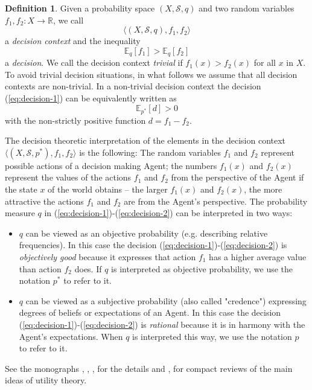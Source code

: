 \documentclass[10pt, letterpaper]{article}%
\theoremstyle{definition}
\newtheorem{definition}[theorem]{Definition}
\newcommand{\E}{\mathbb E}
\newcommand{\1}{\mathbf 1}
\begin{document}
\begin{definition}
Given a probability space $(X,\mathcal{S}, q)$ and two random variables $f_1,f_2\colon X\to\mathbb{R}$, we call
\begin{equation}
\big\langle (X,\mathcal{S},q),f_1,f_2 \big\rangle
\end{equation}
a \emph{decision context} and the inequality 
\begin{equation}\label{eq:decision-1}
\E_q[f_1]  >\E_q[f_2]
\end{equation}
a \emph{decision}. We call the decision context \emph{trivial} if $f_1(x)>f_2(x)$ for all $x$ in $X$. To avoid trivial decision situations, in what follows we assume that all decision contexts are non-trivial. In a non-trivial decision context the decision (\ref{eq:decision-1}) can be equivalently written as 
\begin{equation}\label{eq:decision-2}
\E_{p^*}[d]>0
\end{equation}
with the non-strictly positive function $d=f_1-f_2$. 
\end{definition}
The decision theoretic interpretation of the elements in the decision context $\big\langle (X,\mathcal{S},{p}^*),f_1,f_2 \big\rangle$ is the following: The random variables $f_1$ and $f_2$ represent possible actions of a decision making Agent; the numbers $f_1(x)$ and $f_2(x)$ represent the values of the actions $f_1$ and $f_2$ from the perspective of the Agent if the state $x$ of the world obtains -- the larger $f_1(x)$ and $f_2(x)$, the more attractive the actions $f_1$ and $f_2$ are from the Agent's perspective.
The probability measure $q$ in (\ref{eq:decision-1})-(\ref{eq:decision-2}) can be interpreted in two ways: 
\begin{itemize}
    \item[(i)] $q$ can be viewed as an objective probability (e.g. describing relative frequencies). In this case the decision (\ref{eq:decision-1})-(\ref{eq:decision-2}) is \emph{objectively good} because it expresses that action $f_1$ has a higher average value than action $f_2$ does. If $q$ is interpreted as objective probability, we use the notation $p^*$ to refer to it.   
    \item[(ii)] $q$ can be viewed as a subjective probability (also called "credence") expressing degrees of beliefs or expectations of an Agent. In this case the decision (\ref{eq:decision-1})-(\ref{eq:decision-2}) is \emph{rational} because it is in harmony with the Agent's expectations. When $q$ is interpreted this way, we use the notation $p$ to refer to it. 
\end{itemize}
See the monographs  \cite{Fishburn1970}, \cite{Kreps2019}, \cite{Gilboa2009}, \cite{Bradley2017} for the details and \cite{BriggsSEP2023}, \cite{BuchakSEP2022} for compact reviews of the main ideas of utility theory.
\end{document}
